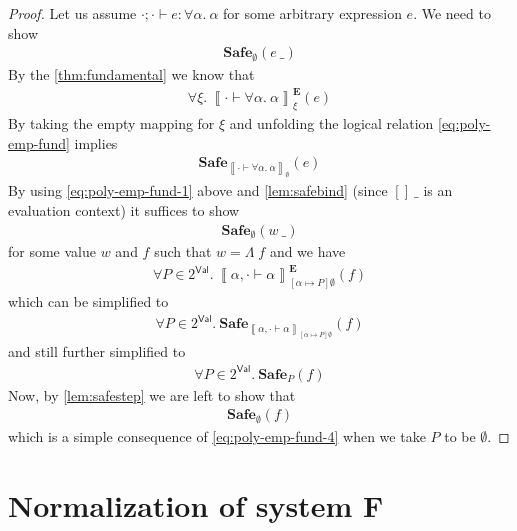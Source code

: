 \documentclass{article}
\newcommand{\VAL}{\mathsf{Val}}
\newcommand{\empectx}{[]}
\newcommand{\pred}{P}
\newcommand{\semtyp}[3]{\left\llbracket #2 \vdash #3 \right\rrbracket_{#1}}
\newcommand{\semErel}[1]{#1^{\textbf{E}}}
\newcommand{\semenv}{\xi}
\newcommand{\TArg}{\_}
\newcommand{\TLam}{\Lambda}
\newcommand{\expr}{e}
\newcommand{\exprB}{f}
\newcommand{\valB}{w}
\newcommand{\tvar}{\alpha}
\newcommand{\typed}[4]{#1; #2 \vdash #3 : #4}
\newcommand{\Safe}[1]{\textbf{Safe}_{#1}}
\begin{document}
\begin{proof}
Let us assume $\typed{\cdot}{\cdot}{\expr}{\forall \tvar.~\tvar}$ for some arbitrary expression $\expr$.
We need to show
\begin{align}
  \label{eq:poly-emp-to-show-1}
  \Safe{\emptyset}(\expr~\TArg)
\end{align}
By the \ref{thm:fundamental} we know that
\begin{align}
  \label{eq:poly-emp-fund}
  \forall \semenv.~ \semErel{\semtyp{\semenv}{\cdot}{\forall \tvar.~\tvar}}(\expr)
\end{align}
By taking the empty mapping for $\semenv$ and unfolding the logical relation \ref{eq:poly-emp-fund} implies
\begin{align}
  \label{eq:poly-emp-fund-1}
  \Safe{\semtyp{\emptyset}{\cdot}{\forall \tvar.~\tvar}}(\expr)
\end{align}
By using \eqref{eq:poly-emp-fund-1} above and \ref{lem:safebind} (since $\empectx~\TArg$ is an evaluation context) it suffices to show
\begin{align}
  \label{eq:poly-emp-to-show-2}
  \Safe{\emptyset}(\valB~\TArg)
\end{align}
for some value $\valB$ and $\exprB$ such that $\valB = \TLam\; \exprB$ and we have
\begin{align}
  \label{eq:poly-emp-fund-2}
  \forall \pred \in 2^{\VAL}.~\semErel{\semtyp{[\tvar \mapsto \pred]\emptyset}{\tvar, \cdot}{\tvar}}(\exprB)
\end{align}
which can be simplified to
\begin{align}
  \label{eq:poly-emp-fund-3}
  \forall \pred \in 2^{\VAL}.~\Safe{\semtyp{[\tvar \mapsto \pred]\emptyset}{\tvar, \cdot}{\tvar}}(\exprB)
\end{align}
and still further simplified to
\begin{align}
  \label{eq:poly-emp-fund-4}
  \forall \pred \in 2^{\VAL}.~\Safe{\pred}(\exprB)
\end{align}
Now, by \ref{lem:safestep} we are left to show that
\begin{align}
  \label{eq:poly-id-to-show-3}
  \Safe{\emptyset}(\exprB)
\end{align}
which is a simple consequence of \eqref{eq:poly-emp-fund-4} when we take $\pred$ to be $\emptyset$.
\end{proof}

\section{Normalization of system F}
\label{sec:norm-syst-f}
\end{document}
